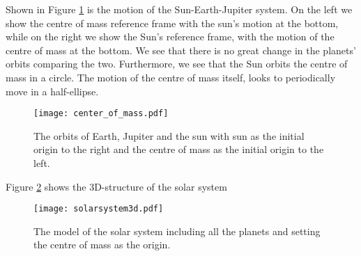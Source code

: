 Shown in Figure \ref{fig:centre of mass} is the motion of the Sun-Earth-Jupiter system.
On the left we show the centre of mass reference frame with the sun's motion at the bottom, while on
the right we show the Sun's reference frame, with the motion of the centre of mass at the bottom.
We see that there is no great change in the planets' orbits comparing the two. Furthermore,
we see that the Sun orbits the centre of mass in a circle. The motion of the centre of mass itself, looks to periodically move in a half-ellipse.
\begin{figure}[htbp]
	\centering
	\texttt{[image: center\_of\_mass.pdf]}
	\caption{The orbits of Earth, Jupiter and the sun with sun as the initial origin to the right and the centre of mass as the initial origin to the left.}
	\label{fig:centre of mass}
\end{figure}

Figure \ref{fig:solar system} shows the 3D-structure of the solar system
\begin{figure}[htbp]
	\centering
	\texttt{[image: solarsystem3d.pdf]}
	\caption{The model of the solar system including all the planets and setting the centre of mass as the origin.}
	\label{fig:solar system}
\end{figure}
